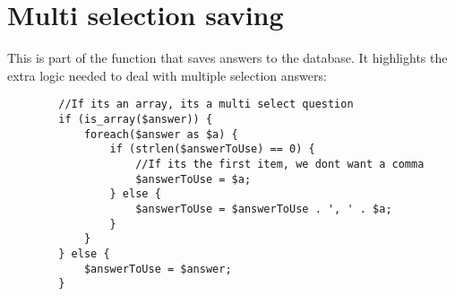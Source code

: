 \section{Multi selection saving}
This is part of the function that saves answers to the database. It highlights the extra logic needed to deal with multiple selection answers:
\begin{verbatim}
        //If its an array, its a multi select question
        if (is_array($answer)) {
            foreach($answer as $a) {
                if (strlen($answerToUse) == 0) {
                    //If its the first item, we dont want a comma
                    $answerToUse = $a;
                } else {
                    $answerToUse = $answerToUse . ', ' . $a;
                }
            }
        } else {
            $answerToUse = $answer;
        }
\end{verbatim}
\newpage

